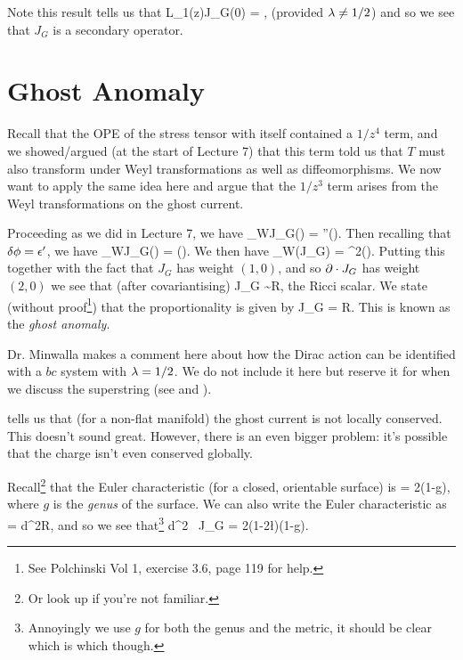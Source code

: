 \br 
    Note this result tells us that 
    \bse 
        L_1(z)J_G(0) = \Res{} ,
    \ese 
    (provided $\lambda\neq1/2$) and so we see that $J_G$ is a secondary operator. 
\er 

\section{Ghost Anomaly}

Recall that the OPE of the stress tensor with itself contained a $1/z^4$ term, and we showed/argued (at the start of Lecture 7) that this term told us that $T$ must also transform under Weyl transformations as well as diffeomorphisms. We now want to apply the same idea here and argue that the $1/z^3$ term arises from the Weyl transformations on the ghost current. 

Proceeding as we did in Lecture 7, we have 
\bse 
    \del_WJ_G(\omega) = \epsilon''(\omega).
\ese 
Then recalling that $\delta\phi = \epsilon'$, we have 
\bse 
    \del_WJ_G(\omega) = \p(\del\phi).
\ese 
We then have 
\bse 
    \del_W(\p\cdot J_G) = \nabla^2(\del\phi). 
\ese
Putting this together with the fact that $J_G$ has weight $(1,0)$, and so $\partial\cdot J_G$ has weight $(2,0)$ we see that (after covariantising) 
\bse 
    \nabla \cdot J_G \sim R,
\ese
the Ricci scalar. We state (without proof\footnote{See Polchinski Vol 1, exercise 3.6, page 119 for help.}) that the proportionality is given by 
\be 
\label{eqn:GhostAnomaly}
    \nabla \cdot J_G = R.
\ee 
This is known as the \textit{ghost anomaly}.

\br 
\label{rem:Dirac}
    Dr. Minwalla makes a comment here about how the Dirac action can be identified with a $bc$ system with $\lambda=1/2$. We do not include it here but reserve it for when we discuss the superstring (see  and ). 
\er 

 tells us that (for a non-flat manifold) the ghost current is not locally conserved. This doesn't sound great. However, there is an even bigger problem: it's possible that the charge isn't even conserved globally. 

Recall\footnote{Or look up if you're not familiar.} that the Euler characteristic (for a closed, orientable surface) is
\bse 
    \chi = 2(1-g),
\ese
where $g$ is the \textit{genus} of the surface. We can also write the Euler characteristic as
\bse 
    \chi = \int d^2\sig {}R,
\ese 
and so we see that\footnote{Annoyingly we use $g$ for both the genus and the metric, it should be clear which is which though.} 
\bse 
    \int d^2\sig {} \, \nabla \cdot J_G = 2\pi(1-2\l)(1-g).
\ese 

